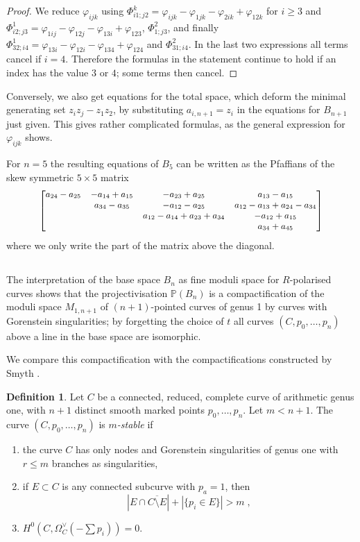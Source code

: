 \documentclass[12pt,a4paper]{amsart}  %
\renewcommand{\P}{\mathbb{P}}
\newcommand{\vp}{\varphi}
\theoremstyle{definition}
\newtheorem{defn}[thm]{Definition}
\theoremstyle{remark}
\begin{document}
\begin{proof}
We reduce $\vp_{ijk}$ using 
$\Phi^k_{i1;j2}=\vp_{ijk}-\vp_{1jk}-\vp_{2ik}+\vp_{12k}$ for $i\geq 3$ 
and $\Phi^1_{i2;j3}=\vp_{1ij}-\vp_{12j}-\vp_{13i}+\vp_{123}$,  $\Phi^2_{1;j3}$,  and
finally $\Phi^1_{32;i4}=\vp_{13i}-\vp_{12i}-\vp_{134}+\vp_{124}$ and $\Phi^2_{31;i4}$. 
In the last two expressions all terms cancel
if  $i=4$. Therefore the formulas in the statement continue to hold if an index has the value
$3$ or $4$; some terms then cancel.
\end{proof}

Conversely, we also get equations for the total space, which deform the minimal
generating set $z_iz_j-z_1z_2$,
by substituting  $a_{i,n+1}=z_i$ in the equations  for $B_{n+1}$ just given.
This gives  rather complicated formulas, as the general expression for 
$\vp_{ijk}$ shows.



For $n=5$ the resulting equations of $B_5$  can be written as the Pfaffians
of the skew symmetric $5\times5$ matrix
\[\small
\begin{bmatrix}
a_{24}-a_{25} &
-a_{14}+a_{15} &
-a_{23}+a_{25} &
a_{13}-a_{15}\\
& a_{34}-a_{35}&
-a_{12}-a_{25}&
a_{12}-a_{13}+a_{24}-a_{34}\\
&&
a_{12}-a_{14}+a_{23}+a_{34}&
-a_{12}+a_{15}\\
&&&
a_{34}+a_{45}
\end{bmatrix}
\]
where we only write the part of the matrix above the diagonal.



\subsection{}
The interpretation of the base space $B_n$  as fine moduli space for $R$-polarised 
curves shows that 
the projectivisation $\P(B_n)$ is 
a compactification of the moduli space $M_{1,n+1}$ of $(n+1)$-pointed
curves of genus 1 by  curves with Gorenstein singularities; by forgetting the choice of $t$
all curves $(C,p_0,\dots,p_n)$ above a line in the base space are isomorphic. 


We compare this compactification with the compactifications constructed by
Smyth \cite{SmI, Sm}.

\begin{defn}\label{def:smyth}
Let $C$ be a connected, reduced, complete curve of arithmetic genus one, with
$n+1$ distinct smooth marked points $p_0,\dots,p_n$. Let $m<n+1$. 
The curve $(C,p_0,\dots,p_n)$ is \textsl{$m$-stable} if
\begin{enumerate}
\item the curve $C$ has only nodes and Gorenstein singularities of genus one
with $r\leq m$ branches as singularities,
\item if $E\subset C$ is any connected subcurve with $p_a=1$, then
\[
|E\cap \overline{C\setminus E}|+|\{p_i\in E\}| > m\;,
\]
\item $H^0(C,\Omega^\vee_C(-\sum p_i))=0$.
\end{enumerate}
\end{defn}
\end{document}
